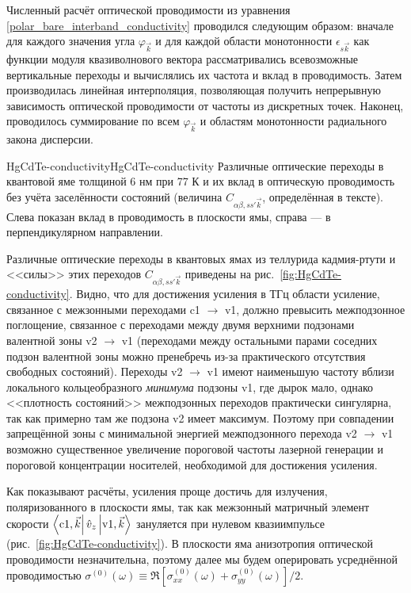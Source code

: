 Численный расчёт оптической проводимости из уравнения \eqref{polar_bare_interband_conductivity} проводился следующим образом: вначале для каждого значения угла $\varphi_{\vec{k}}$ и для каждой области монотонности $\epsilon_{s \vec{k}}$ как функции модуля квазиволнового вектора рассматривались всевозможные вертикальные переходы и вычислялись их частота и вклад в проводимость. Затем производилась линейная интерполяция, позволяющая получить непрерывную зависимость оптической проводимости от частоты из дискретных точек. Наконец, проводилось суммирование по всем $\varphi_{\vec{k}}$ и областям монотонности радиального закона дисперсии.

\begin{fig}{HgCdTe-conductivity}{HgCdTe-conductivity} Различные оптические переходы в квантовой яме \HgCdTe{} толщиной 6 нм при 77 К и их вклад в оптическую проводимость без учёта заселённости состояний (величина $C_{\alpha\beta,ss'\vec{k}}$, определённая в тексте). Слева показан вклад в проводимость в плоскости ямы, справа --- в перпендикулярном направлении.
\end{fig}

Различные оптические переходы в квантовых ямах из теллурида кадмия-ртути и <<силы>> этих переходов $C_{\alpha\beta,ss'\vec{k}}$ приведены на рис.~\ref{fig:HgCdTe-conductivity}. Видно, что для достижения усиления в ТГц области усиление, связанное с межзонными переходами c1 $\rightarrow$ v1, должно превысить межподзонное поглощение, связанное с переходами между двумя верхними подзонами валентной зоны v2 $\rightarrow$ v1 (переходами между остальными парами соседних подзон валентной зоны можно пренебречь из-за практического отсутствия свободных состояний). Переходы v2 $\rightarrow$ v1 имеют наименьшую частоту вблизи локального кольцеобразного \emph{минимума} подзоны v1, где дырок мало, однако <<плотность состояний>> межподзонных переходов практически сингулярна, так как примерно там же подзона v2 имеет максимум. Поэтому при совпадении запрещённой зоны с минимальной энергией межподзонного перехода v2 $\rightarrow$ v1 возможно существенное увеличение пороговой частоты лазерной генерации и пороговой концентрации носителей, необходимой для достижения усиления.

Как показывают расчёты, усиления проще достичь для излучения, поляризованного в плоскости ямы, так как межзонный матричный элемент скорости $\left\langle {\rm c1}, \vec{k} \right\rvert {\hat v}_{z} \left\lvert {\rm v1}, \vec{k} \right\rangle$ зануляется при нулевом квазиимпульсе (рис.~\ref{fig:HgCdTe-conductivity}). В плоскости яма анизотропия оптической проводимости незначительна, поэтому далее мы будем оперировать усреднённой проводимостью $\sigma^{(0)}(\omega) \equiv \Re \left[ \sigma^{(0)}_{xx}(\omega) + \sigma^{(0)}_{yy}(\omega) \right]/2$.

